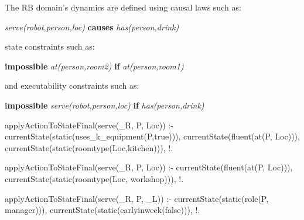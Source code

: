

The RB domain's dynamics are defined using causal laws such as:

\textit{serve(robot,person,loc)} \textbf{causes} \textit{has(person,drink)}

state constraints such as:

\textbf{impossible} \textit{at(person,room2)} \textbf{if} \textit{at(person,room1)}

and executability constraints such as:

\textbf{impossible} \textit{serve(robot,person,loc)} \textbf{if} \textit{has(person,drink)}



applyActionToStateFinal(serve(_R, P, Loc)) :-
	currentState(static(uses_k_equipment(P,true))),
	currentState(fluent(at(P, Loc))),
	currentState(static(roomtype(Loc,kitchen))),
	!.
	
applyActionToStateFinal(serve(_R, P, Loc)) :-
	currentState(fluent(at(P, Loc))),
	currentState(static(roomtype(Loc, workshop))),
	!.
	
applyActionToStateFinal(serve(_R, P, _L)) :-
	currentState(static(role(P, manager))),
	currentState(static(earlyinweek(false))),
	!.
	
	
	